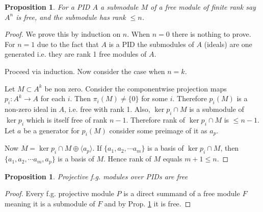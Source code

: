 \documentclass[12pt]{article}
\numberwithin{equation}{section}
\newcounter{dummy} \numberwithin{dummy}{section}
\newtheorem{lemma}[dummy]{Lemma}
\newtheorem{proposition}[dummy]{Proposition}
\begin{document}
	\begin{proposition}\label{submodoffreemodisfreepid}
		For a PID $A$ a submodule $M$ of a free module of finite rank say $A^n $ is free, and the submodule has rank $\leq n$.
	\end{proposition}
	\begin{proof}
		We prove this by induction on $n$. When $n=0$ there is nothing to prove. For $n=1$ due to the fact that $A$ is a PID the submodules of $A$ (ideals) are one generated i.e. they are rank 1 free modules of $A$.
		
		Proceed via induction. Now consider the case when $n=k$. 
		
		Let $M \subset A^k$ be non zero. Consider the componentwise projection maps $p_i: A^{k} \to A$ for each $i$. Then $\pi_i(M) \neq \{0\}$ for some $i$. Therefore $p_i(M)$ is a non-zero ideal in $A$, i.e. free with rank 1. Also, $\ker p_i \cap M$ is a submodule of $\ker p_i$ which is itself free of rank $n-1$. Therefore rank of $\ker p_i \cap M$ is $\leq n - 1$. Let $a$ be a generator for $p_i(M)$ consider some preimage of it as $a_p$.
		
		Now $M = \ker p_i \cap M \oplus \langle a_p \rangle$. If $\{a_1, a_2, \cdots a_m\}$ is a basis of $\ker p_i \cap M$, then $\{a_1, a_2, \cdots a_m, a_p \}$ is a basis of $M$. Hence rank of $M$ equals $m + 1 \leq n$. 
		
	\end{proof}
	
	\begin{proposition}\label{projfgpidfree}
		Projective f.g. modules over PIDs are free
	\end{proposition}
	\begin{proof}
		Every f.g. projective module $P$ is a direct summand of a free module $F$ meaning it is a submodule of $F$ and by Prop. \ref{submodoffreemodisfreepid} it is free.
	\end{proof}
	
\end{document}
